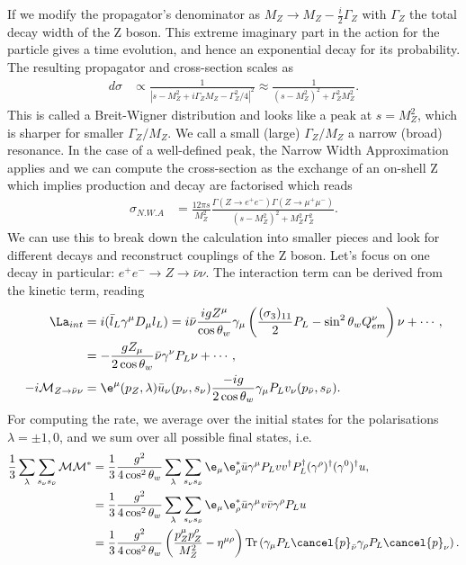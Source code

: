 \documentclass[relqm.tex]{subfiles}
\begin{document}
If we modify the propagator's denominator as $M_Z\to M_Z-\frac{i}{2}\Gamma_Z$ with $\Gamma_Z$ the total decay width of the Z boson. 
This extreme imaginary part in the action for the particle gives a time evolution, and hence an exponential decay for its probability. 
The resulting propagator and cross-section scales as
\begin{align}
    d\sigma &\propto \frac{1}{|s-M_Z^2+i\Gamma_ZM_Z - \Gamma_Z^2/4|^2} \approx \frac{1}{(s-M_Z^2)^2+\Gamma_Z^2M_Z^2}.
\end{align}
This is called a Breit-Wigner distribution and looks like a peak at $s=M_Z^2$, which is sharper for smaller $\Gamma_Z/M_Z$. 
We call a small (large) $\Gamma_Z/M_Z$ a narrow (broad) resonance.
In the case of a well-defined peak, the Narrow Width Approximation applies and we can compute the cross-section as the exchange of an on-shell Z which implies production and decay are factorised which reads
\begin{align}
    \sigma_{N.W.A} &= \frac{12\pi s}{M_Z^2} \frac{\Gamma(Z\to e^+e^-)\Gamma(Z\to\mu^+\mu^-)}{(s-M_Z^2)^2+M_Z^2\Gamma_Z^2}.
\end{align}
We can use this to break down the calculation into smaller pieces and look for different decays and reconstruct couplings of the Z boson. 
Let's focus on one decay in particular: $e^+e^-\to Z\to\bar{\nu}\nu$.
The interaction term can be derived from the kinetic term, reading
\begin{align}
    \La_{int} &= i(\bar{l}_L\gamma^\mu D_\mu l_L) = i\bar{\nu}\frac{igZ^\mu}{\cos\theta_w}\gamma_\mu\left(\frac{(\sigma_3)_{11}}{2}P_L - \sin^2\theta_w Q_{em}^\nu\right)\nu + \cdots, \\
              &= -\frac{gZ_\mu}{2\cos\theta_w}\bar{\nu}\gamma^\nu P_L\nu + \cdots, \\
    -i\mathcal{M}_{Z\to\bar{\nu}\nu} &= \e^\mu(p_Z,\lambda)\bar{u}_\nu(p_\nu,s_\nu)\frac{-ig}{2\cos\theta_w}\gamma_\mu P_Lv_\nu(p_{\bar{\nu}},s_{\bar{\nu}}).
\end{align}
For computing the rate, we average over the initial states for the polarisations $\lambda=\pm1,0$, and we sum over all possible final states, i.e.
\begin{align}
    \frac13 \sum_{\lambda} \sum_{s_\nu s_{\bar{\nu}}} \mathcal{M}\mathcal{M}^* &= \frac13 \frac{g^2}{4\cos^2\theta_w} \sum_\lambda \sum_{s_\nu s_{\bar{\nu}}} \e_\mu\e_\rho^* \bar{u}\gamma^\mu P_L vv^\dagger P_L^\dagger (\gamma^\rho)^\dagger (\gamma^0)^\dagger u, \\
                                                                               &= \frac13 \frac{g^2}{4\cos^2\theta_w} \sum_\lambda \sum_{s_\nu s_{\bar{\nu}}} \e_\mu\e_\rho^* \bar{u}\gamma^\mu v\bar{v}\gamma^\rho P_L u \\
                                                                               &= \frac13 \frac{g^2}{4\cos^2\theta_w} \left(\frac{p^\mu_Z p^\rho_Z}{M_Z^2} - \eta^{\mu\rho}\right)\text{Tr}\left(\gamma_\mu P_L\cancel{p}_{\bar{\nu}}\gamma_\rho P_L\cancel{p}_\nu\right).
\end{align}
\end{document}
